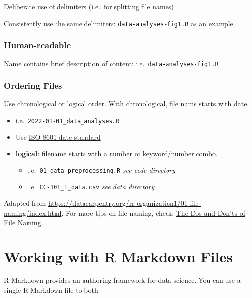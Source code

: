 \documentclass[
]{article}
\begin{document}
Deliberate use of delimiters (i.e.~for splitting file names)

Consistently use the same delimiters: \texttt{data-analyses-fig1.R} as
an example

\hypertarget{human-readable}{%
\subsubsection{Human-readable}\label{human-readable}}

Name contains brief description of content:
i.e.~\texttt{data-analyses-fig1.R}

\hypertarget{ordering-files}{%
\subsubsection{Ordering Files}\label{ordering-files}}

Use chronological or logical order. With chronological, file name starts
with date.

\begin{itemize}
\item
  i.e.~\texttt{2022-01-01\_data\_analyses.R}
\item
  Use \href{https://en.wikipedia.org/wiki/ISO_8601}{ISO 8601 date
  standard}
\item
  \textbf{logical}: filename starts with a number or keyword/number
  combo.

  \begin{itemize}
  \item
    i.e.~\texttt{01\_data\_preprocessing.R} \emph{see code directory}
  \item
    i.e.~\texttt{CC-101\_1\_data.csv} \emph{see data directory}
  \end{itemize}
\end{itemize}

Adapted from
\url{https://datacarpentry.org/rr-organization1/01-file-naming/index.html}.
For more tips on file naming, check:
\href{https://www.library.ucsb.edu/sites/default/files/dls-n01-2021-filenaming.pdf}{The
Dos and Don'ts of File Naming}.

\hypertarget{working-with-r-markdown-files}{%
\section{Working with R Markdown
Files}\label{working-with-r-markdown-files}}

R Markdown provides an authoring framework for data science. You can use
a single R Markdown file to both
\end{document}
